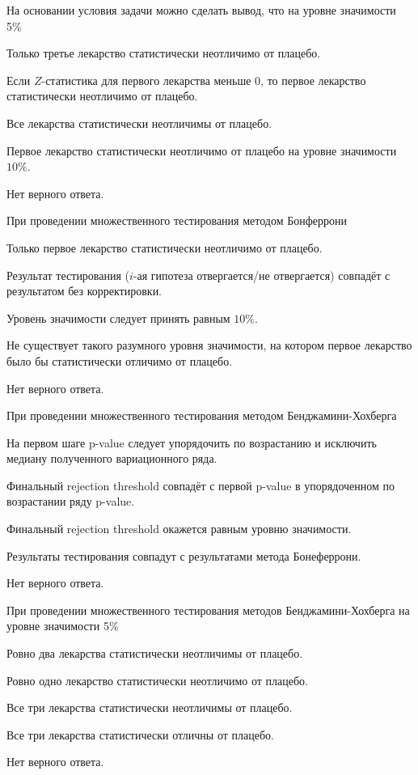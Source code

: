 \documentclass[10pt, a4paper]{exam}
\begin{document}
	\begin{questions}
		\question На основании условия задачи можно сделать вывод, что на уровне значимости 5\%
		\begin{choices}
			\item Только третье лекарство статистически неотличимо от плацебо.
			\item Если $Z$-статистика для первого лекарства меньше 0, то первое лекарство статистически неотличимо от плацебо.
			\item Все лекарства статистически неотличимы от плацебо.
			\item Первое лекарство статистически неотличимо от плацебо на уровне значимости $10\%$.
			\item Нет верного ответа.
		\end{choices}
	
		\question При проведении множественного тестирования методом Бонферрони
		\begin{choices}
			\item Только первое лекарство статистически неотличимо от плацебо.
			\item Результат тестирования ($i$-ая гипотеза отвергается/не отвергается) совпадёт с результатом без корректировки.
			\item Уровень значимости следует принять равным $10\%$.
			\item Не существует такого разумного уровня значимости, на котором первое лекарство было бы статистически отличимо от плацебо.
			\item Нет верного ответа.
		\end{choices}
	
		\question При проведении множественного тестирования методом Бенджамини-Хохберга
		\begin{choices}
			\item На первом шаге p-value следует упорядочить по возрастанию и исключить медиану полученного вариационного ряда.
			\item Финальный rejection threshold совпадёт с первой p-value в упорядоченном по возрастании ряду p-value.
			\item Финальный rejection threshold окажется равным уровню значимости.
			\item Результаты тестирования совпадут с результатами метода Бонеферрони.
			\item Нет верного ответа.
		\end{choices}
	
		\question При проведении множественного тестирования методов Бенджамини-Хохберга на уровне значимости 5\%
		\begin{choices}
			\item Ровно два лекарства статистически неотличимы от плацебо.
			\item Ровно одно лекарство статистически неотличимо от плацебо.
			\item Все три лекарства статистически неотличимы от плацебо.
			\item Все три лекарства статистически отличны от плацебо.
			\item Нет верного ответа.
		\end{choices}
	\end{questions}
	
\end{document}
